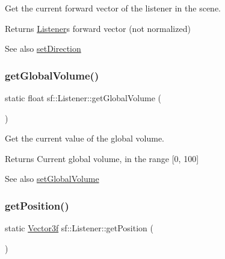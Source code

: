 Get the current forward vector of the listener in the scene. 

\begin{DoxyReturn}{Returns}
\hyperlink{classsf_1_1_listener}{Listener}\textquotesingle{}s forward vector (not normalized)
\end{DoxyReturn}
\begin{DoxySeeAlso}{See also}
\hyperlink{classsf_1_1_listener_ae479dc15513c6557984d26e32d06d06e}{set\+Direction} 
\end{DoxySeeAlso}
\mbox{\label{classsf_1_1_listener_a137ea535799bdf70be6ec969673d4d33}} 
\subsubsection{\texorpdfstring{get\+Global\+Volume()}{getGlobalVolume()}}
{\footnotesize\ttfamily static float sf\+::\+Listener\+::get\+Global\+Volume (\begin{DoxyParamCaption}{ }\end{DoxyParamCaption})\hspace{0.3cm}{\ttfamily [static]}}



Get the current value of the global volume. 

\begin{DoxyReturn}{Returns}
Current global volume, in the range \mbox{[}0, 100\mbox{]}
\end{DoxyReturn}
\begin{DoxySeeAlso}{See also}
\hyperlink{classsf_1_1_listener_a803a24a1fc04620cacc9f88c6fbc0e3a}{set\+Global\+Volume} 
\end{DoxySeeAlso}
\mbox{\label{classsf_1_1_listener_acd7ee65bc948ca38e1c669aa12340c54}} 
\subsubsection{\texorpdfstring{get\+Position()}{getPosition()}}
{\footnotesize\ttfamily static \hyperlink{classsf_1_1_vector3}{Vector3f} sf\+::\+Listener\+::get\+Position (\begin{DoxyParamCaption}{ }\end{DoxyParamCaption})\hspace{0.3cm}{\ttfamily [static]}}



